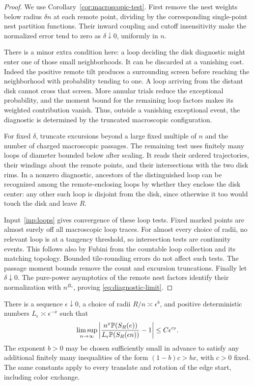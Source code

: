 \begin{proof}
We use Corollary~\ref{cor:macroscopic-test}. First remove the nest weights
below radius $\delta n$ at each remote point, dividing by the
corresponding single-point nest partition functions. Their inward
coupling and cutoff insensitivity make the normalized error tend to
zero as $\delta\downarrow0$, uniformly in $n$.

There is a minor extra condition here: a loop deciding the disk
diagnostic might enter one of those small neighborhoods. It can be
discarded at a vanishing cost. Indeed the positive remote tilt produces
a surrounding screen before reaching the neighborhood with probability
tending to one. A loop arriving from the distant disk cannot cross
that screen. More annular trials reduce the exceptional probability,
and the moment bound for the remaining loop factors makes its weighted
contribution vanish. Thus, outside a vanishing exceptional event, the
diagnostic is determined by the truncated macroscopic configuration.

For fixed $\delta$, truncate excursions beyond a large fixed multiple
of $n$ and the number of charged macroscopic passages. The remaining
test uses finitely many loops of diameter bounded below after scaling.
It reads their ordered trajectories, their windings about the remote
points, and their intersections with the two disk rims. In a nonzero
diagnostic, ancestors of the distinguished loop can be recognized
among the remote-enclosing loops by whether they enclose the disk
center: any other such loop is disjoint from the disk, since otherwise
it too would touch the disk and leave $R$.

Input~\ref{inp:loops} gives convergence of these loop tests. Fixed
marked points are almost surely off all macroscopic loop traces.
For almost every choice of radii, no relevant loop is at a tangency
threshold, so intersection tests are continuity events. This follows
also by Fubini from the countable loop collection and its matching
topology. Bounded tile-rounding errors do not affect such tests.
The passage moment bounds remove the count and excursion truncations.
Finally let $\delta\downarrow0$. The pure-power asymptotics of the
remote nest factors identify their normalization with $n^{B_*}$,
proving \eqref{eq:diagnostic-limit}.
\end{proof}

\begin{proposition}\label{prop:disk-calibration}
There is a sequence $\epsilon\downarrow0$, a choice of radii
$R/n\asymp\epsilon^b$, and positive deterministic numbers
$L_\epsilon\asymp\epsilon^{-x}$ such that
\begin{equation}\label{eq:disk-calibration}
 \limsup_{n\to\infty}
 \left|
 \frac{n^x\mathbb P(S_R(e))}{L_\epsilon\mathbb P(S_R(\epsilon n))}-1
 \right|\le C\epsilon^{c_7}.
\end{equation}
The exponent $b>0$ may be chosen sufficiently small in advance to
satisfy any additional finitely many inequalities of the form
$(1-b)c>bx$, with $c>0$ fixed. The same constants apply to every
translate and rotation of the edge start, including color exchange.
\end{proposition}

